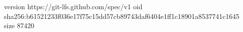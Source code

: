 version https://git-lfs.github.com/spec/v1
oid sha256:b61521233f036e17f75c15dd57cb89743daf6404e1ff1c18901a8537741c1645
size 87420
